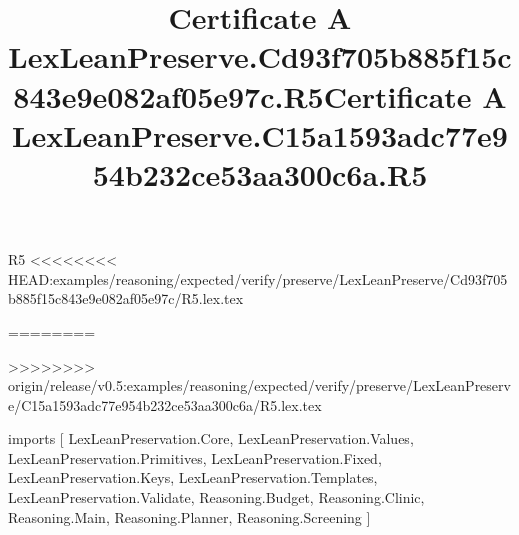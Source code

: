 \begin{lexlean}{R5}
<<<<<<<< HEAD:examples/reasoning/expected/verify/preserve/LexLeanPreserve/Cd93f705b885f15c843e9e082af05e97c/R5.lex.tex
\title{Certificate A LexLeanPreserve.Cd93f705b885f15c843e9e082af05e97c.R5}
========
\title{Certificate A LexLeanPreserve.C15a1593adc77e954b232ce53aa300c6a.R5}
>>>>>>>> origin/release/v0.5:examples/reasoning/expected/verify/preserve/LexLeanPreserve/C15a1593adc77e954b232ce53aa300c6a/R5.lex.tex
\begin{coremodule}
imports [
  LexLeanPreservation.Core,
  LexLeanPreservation.Values,
  LexLeanPreservation.Primitives,
  LexLeanPreservation.Fixed,
  LexLeanPreservation.Keys,
  LexLeanPreservation.Templates,
  LexLeanPreservation.Validate,
  Reasoning.Budget,
  Reasoning.Clinic,
  Reasoning.Main,
  Reasoning.Planner,
  Reasoning.Screening
]


\end{coremodule}
\end{lexlean}
